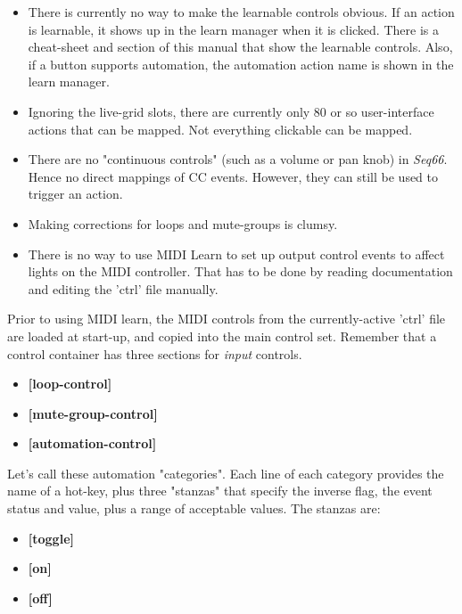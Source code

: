    \begin{itemize}
      \item There is currently no way to make the learnable
         controls obvious. If an action is learnable, it
         shows up in the learn manager when it is clicked.
         There is a cheat-sheet and section of this manual
         that show the learnable controls.
         Also, if a button supports automation, the
         automation action name is shown in the learn manager.
      \item Ignoring the live-grid slots, there are currently only
         80 or so user-interface actions that can be mapped.
         Not everything clickable can be mapped.
      \item There are no "continuous controls" (such as a volume
         or pan knob) in \textsl{Seq66}.
         Hence no direct mappings of CC events.
         However, they can still be used to trigger
         an action.
      \item Making corrections for loops and mute-groups is clumsy.
      \item There is no way to use MIDI Learn to set up output
         control events to affect lights on the MIDI controller.
         That has to be done by reading documentation and
         editing the 'ctrl' file manually.
   \end{itemize}

   Prior to using MIDI learn, the MIDI controls from the currently-active
   'ctrl' file are loaded at start-up, and copied into the main
   control set.  Remember that a control container has three sections for
   \textsl{input} controls.

   \begin{itemize}
      \item \textbf{[loop-control]}
      \item \textbf{[mute-group-control]}
      \item \textbf{[automation-control]}
   \end{itemize}

   Let's call these automation "categories".
   Each line of each category provides the name of a hot-key, plus
   three "stanzas" that specify the inverse flag, the event status and
   value, plus a range of acceptable values.
   The stanzas are:

   \begin{itemize}
      \item \textbf{[toggle]}
      \item \textbf{[on]}
      \item \textbf{[off]}
   \end{itemize}

